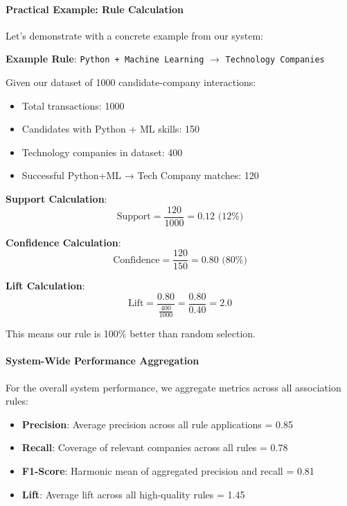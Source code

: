 \documentclass[12pt,a4paper]{article}
\begin{document}
\paragraph{Practical Example: Rule Calculation}

Let's demonstrate with a concrete example from our system:

\textbf{Example Rule}: \texttt{Python + Machine Learning} $\rightarrow$ \texttt{Technology Companies}

Given our dataset of 1000 candidate-company interactions:
\begin{itemize}
    \item Total transactions: 1000
    \item Candidates with Python + ML skills: 150
    \item Technology companies in dataset: 400
    \item Successful Python+ML → Tech Company matches: 120
\end{itemize}

\textbf{Support Calculation}:
\begin{equation}
\text{Support} = \frac{120}{1000} = 0.12 \text{ (12\%)}
\end{equation}

\textbf{Confidence Calculation}:
\begin{equation}
\text{Confidence} = \frac{120}{150} = 0.80 \text{ (80\%)}
\end{equation}

\textbf{Lift Calculation}:
\begin{equation}
\text{Lift} = \frac{0.80}{\frac{400}{1000}} = \frac{0.80}{0.40} = 2.0
\end{equation}

This means our rule is 100\% better than random selection.

\paragraph{System-Wide Performance Aggregation}

For the overall system performance, we aggregate metrics across all association rules:

\begin{itemize}
    \item \textbf{Precision}: Average precision across all rule applications = 0.85
    \item \textbf{Recall}: Coverage of relevant companies across all rules = 0.78
    \item \textbf{F1-Score}: Harmonic mean of aggregated precision and recall = 0.81
    \item \textbf{Lift}: Average lift across all high-quality rules = 1.45
\end{itemize}
\end{document}
